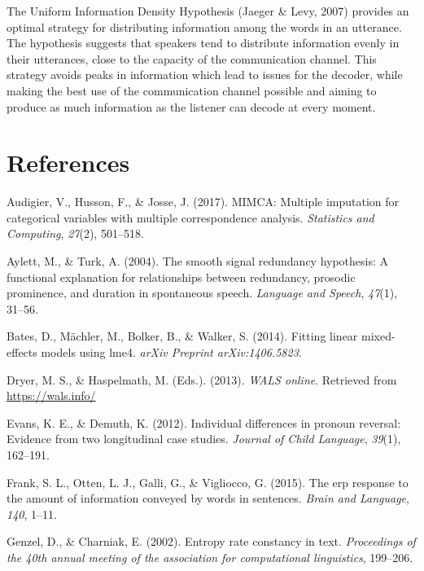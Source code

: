 \documentclass[11pt,]{article}
\begin{document}
The Uniform Information Density Hypothesis (Jaeger \& Levy, 2007) provides an optimal strategy for distributing information among the words in an utterance. The hypothesis suggests that speakers tend to distribute information evenly in their utterances, close to the capacity of the communication channel. This strategy avoids peaks in information which lead to issues for the decoder, while making the best use of the communication channel possible and aiming to produce as much information as the listener can decode at every moment.

\hypertarget{references}{%
\section*{References}\label{references}}

\hypertarget{refs}{}
\leavevmode\hypertarget{ref-audigier2017mimca}{}%
Audigier, V., Husson, F., \& Josse, J. (2017). MIMCA: Multiple imputation for categorical variables with multiple correspondence analysis. \emph{Statistics and Computing}, \emph{27}(2), 501--518.

\leavevmode\hypertarget{ref-aylett2004smooth}{}%
Aylett, M., \& Turk, A. (2004). The smooth signal redundancy hypothesis: A functional explanation for relationships between redundancy, prosodic prominence, and duration in spontaneous speech. \emph{Language and Speech}, \emph{47}(1), 31--56.

\leavevmode\hypertarget{ref-bates2014fitting}{}%
Bates, D., Mächler, M., Bolker, B., \& Walker, S. (2014). Fitting linear mixed-effects models using lme4. \emph{arXiv Preprint arXiv:1406.5823}.

\leavevmode\hypertarget{ref-wals}{}%
Dryer, M. S., \& Haspelmath, M. (Eds.). (2013). \emph{WALS online}. Retrieved from \url{https://wals.info/}

\leavevmode\hypertarget{ref-evans2012individual}{}%
Evans, K. E., \& Demuth, K. (2012). Individual differences in pronoun reversal: Evidence from two longitudinal case studies. \emph{Journal of Child Language}, \emph{39}(1), 162--191.

\leavevmode\hypertarget{ref-frank2015erp}{}%
Frank, S. L., Otten, L. J., Galli, G., \& Vigliocco, G. (2015). The erp response to the amount of information conveyed by words in sentences. \emph{Brain and Language}, \emph{140}, 1--11.

\leavevmode\hypertarget{ref-genzel2002entropy}{}%
Genzel, D., \& Charniak, E. (2002). Entropy rate constancy in text. \emph{Proceedings of the 40th annual meeting of the association for computational linguistics}, 199--206.
\end{document}
